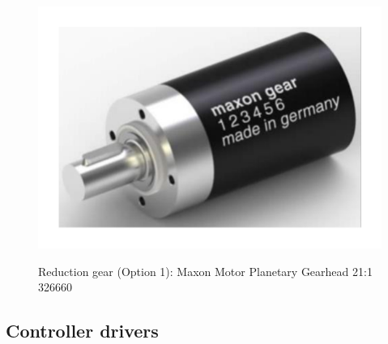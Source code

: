 \begin{figure}
  \centering
  \includegraphics[angle=90,width=1\columnwidth]{figs/body02/FIGDEVICEGEAROPTION1.pdf}\\
  \caption[Reduction gear (Option 1): Maxon Motor Planetary Gearhead 21:1 326660]{Reduction gear (Option 1): Maxon Motor Planetary Gearhead 21:1 326660}
  \label{FIG:DEVICEGEAROPTION1}
\end{figure}
\subsection{Controller drivers}
